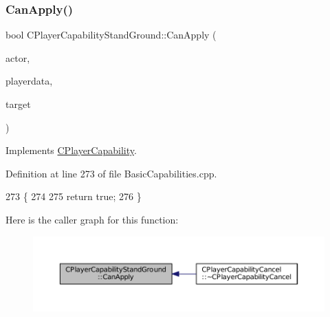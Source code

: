 \subsubsection{\texorpdfstring{Can\+Apply()}{CanApply()}}
{\footnotesize\ttfamily bool C\+Player\+Capability\+Stand\+Ground\+::\+Can\+Apply (\begin{DoxyParamCaption}\item[{std\+::shared\+\_\+ptr$<$ \hyperlink{classCPlayerAsset}{C\+Player\+Asset} $>$}]{actor,  }\item[{std\+::shared\+\_\+ptr$<$ \hyperlink{classCPlayerData}{C\+Player\+Data} $>$}]{playerdata,  }\item[{std\+::shared\+\_\+ptr$<$ \hyperlink{classCPlayerAsset}{C\+Player\+Asset} $>$}]{target }\end{DoxyParamCaption})\hspace{0.3cm}{\ttfamily [virtual]}}



Implements \hyperlink{classCPlayerCapability_ae96263e0950f496492f8baeb877b9554}{C\+Player\+Capability}.



Definition at line 273 of file Basic\+Capabilities.\+cpp.


\begin{DoxyCode}
273                                                                                                            
                                                        \{
274     
275     \textcolor{keywordflow}{return} \textcolor{keyword}{true};
276 \}
\end{DoxyCode}
Here is the caller graph for this function\+:\nopagebreak
\begin{figure}[H]
\begin{center}
\leavevmode
\includegraphics[width=350pt]{classCPlayerCapabilityStandGround_a468f2618edaebf2088b5917d2688b6f6_icgraph}
\end{center}
\end{figure}
\hypertarget{classCPlayerCapabilityStandGround_a5567bfa47166f4080bd2b86f5c33e29c}{}\label{classCPlayerCapabilityStandGround_a5567bfa47166f4080bd2b86f5c33e29c} 
